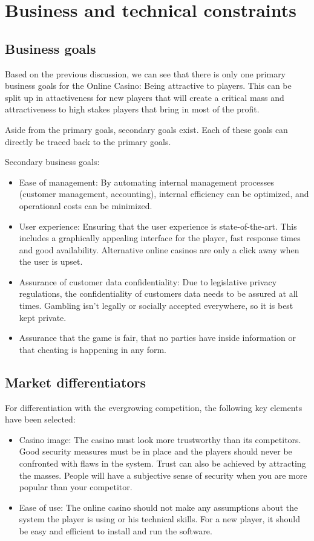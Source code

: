 \documentclass[a4paper,11pt]{report}
\begin{document}
\section{Business and technical constraints}

\subsection{Business goals}
Based on the previous discussion, we can see that there is only one primary business goals for the Online Casino: Being attractive to players.
This can be split up in attactiveness for new players that will create a critical mass and attractiveness to high stakes players that bring in most of the profit.

Aside from the primary goals, secondary goals exist. Each of these goals can directly be traced back to 
the primary goals.

Secondary business goals:
\begin{itemize}
\item Ease of management: By automating internal management processes (customer management, accounting), internal efficiency can be optimized, and operational costs can be minimized.
\item User experience: Ensuring that the user experience is state-of-the-art. This includes a graphically appealing interface for the player, fast response times and good availability. Alternative online casinos are only a click away when the user is upset.
\item Assurance   of   customer   data   confidentiality:   Due   to   legislative   privacy   regulations,   the confidentiality of customers data needs to be assured at all times. Gambling isn't legally or socially accepted everywhere, so it is best kept private.
\item Assurance that the game is fair, that no parties have inside information or that cheating is happening in any form.
\end{itemize}

\subsection{Market differentiators}
For differentiation with the evergrowing competition, the following key elements have been selected:
\begin{itemize}
\item Casino image: The casino must look more trustworthy than its competitors. Good security measures must be in place and the players should never be confronted with flaws in the system. Trust can also be achieved by attracting the masses. People will have a subjective sense of security when you are more popular than your competitor.
\item Ease of use: The online casino should not make any assumptions about the system the player is using or his technical skills. For a new player, it should be easy and efficient to install and run the software.
\end{itemize}
\end{document}
